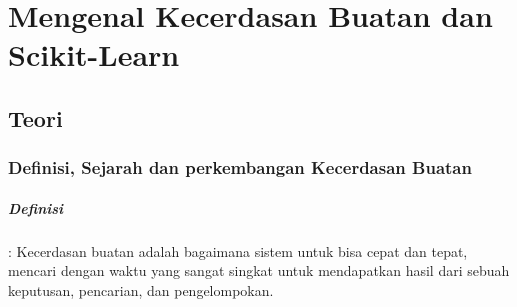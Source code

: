 \chapter{Mengenal Kecerdasan Buatan dan
Scikit-Learn}
\section{Teori}
\subsection{ Definisi, Sejarah dan perkembangan Kecerdasan Buatan}
\paragraph{Definisi}: Kecerdasan buatan adalah bagaimana sistem untuk bisa cepat dan tepat, mencari dengan waktu yang sangat singkat untuk mendapatkan hasil dari sebuah keputusan, pencarian, dan pengelompokan.
